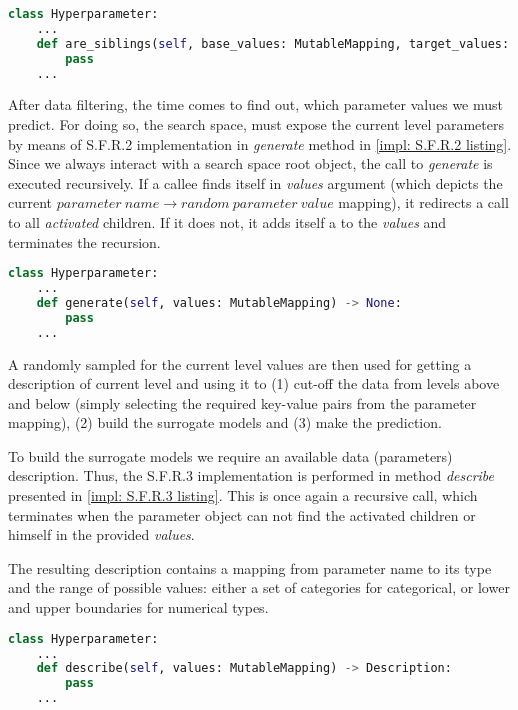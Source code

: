 \begin{lstlisting}[language=Python, caption=S.F.R.1 implementation., label=impl: S.F.R.1 listing]
class Hyperparameter:
	...
    def are_siblings(self, base_values: MutableMapping, target_values: MutableMapping) -> bool:
    	pass
	...
\end{lstlisting}

After data filtering, the time comes to find out, which parameter values we must predict. For doing so, the search space, must expose the current level parameters by means of S.F.R.2 implementation in \emph{generate} method in \cref{impl: S.F.R.2 listing}. Since we always interact with a search space root object, the call to \emph{generate} is executed recursively. If a callee finds itself in \emph{values} argument (which depicts the current $parameter\ name \rightarrow random\ parameter\ value$ mapping), it redirects a call to all \textit{activated} children. If it does not, it adds itself a to the \emph{values} and terminates the recursion.

\begin{lstlisting}[language=Python, caption=S.F.R.2 implementation., label=impl: S.F.R.2 listing]
class Hyperparameter:
	...
    def generate(self, values: MutableMapping) -> None:
    	pass
	...
\end{lstlisting}

A randomly sampled for the current level values are then used for getting a description of current level and using it to (1) cut-off the data from levels above and below (simply selecting the required key-value pairs from the parameter mapping), (2) build the surrogate models and (3) make the prediction.

To build the surrogate models we require an available data (parameters) description. Thus, the S.F.R.3 implementation is performed in method \emph{describe} presented in \cref{impl: S.F.R.3 listing}. This is once again a recursive call, which terminates when the parameter object can not find the activated children or himself in the provided \emph{values}.

The resulting description contains a mapping from parameter name to its type and the range of possible values: either a set of categories for categorical, or lower and upper boundaries for numerical types.

\begin{lstlisting}[language=Python, caption=S.F.R.3 implementation., label=impl: S.F.R.3 listing]
class Hyperparameter:
	...
    def describe(self, values: MutableMapping) -> Description:
    	pass
	...
\end{lstlisting}

